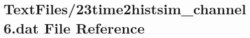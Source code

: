 \hypertarget{23time2histsim__channel6_8dat}{}\section{Text\+Files/23time2histsim\+\_\+channel6.dat File Reference}
\label{23time2histsim__channel6_8dat}
